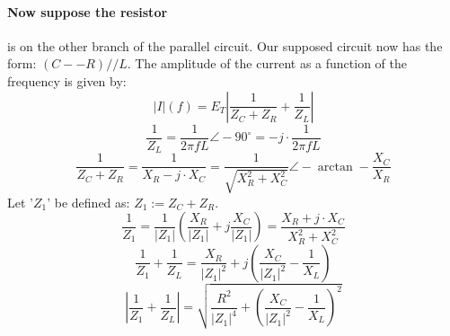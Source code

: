 \documentclass{article}
\begin{document}
	\paragraph[Swap]{Now suppose the resistor} is on the other branch of the 
	parallel circuit.  Our supposed circuit now has the form: $(C--R)//L$.  The 
	amplitude of the current as a function of the 
	frequency is given by:
	$$ |I|(f) = E_T\left| \frac{1}{Z_C+Z_R} + \frac{1}{Z_L} \right|$$
	$$ \frac{1}{Z_L} = \frac{1}{2\pi f L}\angle-90^{\circ} = - j\cdot 
	\frac{1}{2\pi f L}$$
	$$ \frac{1}{Z_C + Z_R} = \frac{1}{X_R - j \cdot X_C} =  
	\frac{1}{\sqrt{X_R^2 + X_C^2}}\angle-\arctan -\frac{X_C}{X_R}$$
	Let '$Z_1$' be defined as: $Z_1:=Z_C+Z_R$.
	$$ \frac{1}{Z_1} = \frac{1}{|Z_1|} \left( \frac{X_R}{|Z_1|} + j 
	\frac{X_C}{|Z_1|}\right) = \frac{X_R + j \cdot X_C}{X_R^2 + X_C^2}$$
	$$ \frac{1}{Z_1} + \frac{1}{Z_L} = \frac{X_R}{|Z_1|^2} + j \left( 
	\frac{X_C}{|Z_1|^2} - \frac{1}{X_L}\right)$$
	$$ \left| \frac{1}{Z_1} + \frac{1}{Z_L} \right| = \sqrt{\frac{R^2}{|Z_1|^4} 
	+ \left(\frac{X_C}{|Z_1|^2} - \frac{1}{X_L}\right)^2}$$
\end{document}
